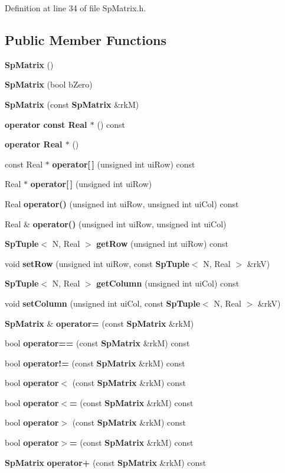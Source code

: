 Definition at line 34 of file Sp\-Matrix.h.\subsection*{Public Member Functions}
\begin{CompactItemize}
\item 
{\bf Sp\-Matrix} ()
\item 
{\bf Sp\-Matrix} (bool b\-Zero)
\item 
{\bf Sp\-Matrix} (const {\bf Sp\-Matrix} \&rk\-M)
\item 
{\bf operator const Real $\ast$} () const
\item 
{\bf operator Real $\ast$} ()
\item 
const Real $\ast$ {\bf operator[$\,$]} (unsigned int ui\-Row) const
\item 
Real $\ast$ {\bf operator[$\,$]} (unsigned int ui\-Row)
\item 
Real {\bf operator()} (unsigned int ui\-Row, unsigned int ui\-Col) const
\item 
Real \& {\bf operator()} (unsigned int ui\-Row, unsigned int ui\-Col)
\item 
{\bf Sp\-Tuple}$<$ N, Real $>$ {\bf get\-Row} (unsigned int ui\-Row) const
\item 
void {\bf set\-Row} (unsigned int ui\-Row, const {\bf Sp\-Tuple}$<$ N, Real $>$ \&rk\-V)
\item 
{\bf Sp\-Tuple}$<$ N, Real $>$ {\bf get\-Column} (unsigned int ui\-Col) const
\item 
void {\bf set\-Column} (unsigned int ui\-Col, const {\bf Sp\-Tuple}$<$ N, Real $>$ \&rk\-V)
\item 
{\bf Sp\-Matrix} \& {\bf operator=} (const {\bf Sp\-Matrix} \&rk\-M)
\item 
bool {\bf operator==} (const {\bf Sp\-Matrix} \&rk\-M) const
\item 
bool {\bf operator!=} (const {\bf Sp\-Matrix} \&rk\-M) const
\item 
bool {\bf operator$<$} (const {\bf Sp\-Matrix} \&rk\-M) const
\item 
bool {\bf operator$<$=} (const {\bf Sp\-Matrix} \&rk\-M) const
\item 
bool {\bf operator$>$} (const {\bf Sp\-Matrix} \&rk\-M) const
\item 
bool {\bf operator$>$=} (const {\bf Sp\-Matrix} \&rk\-M) const
\item 
{\bf Sp\-Matrix} {\bf operator+} (const {\bf Sp\-Matrix} \&rk\-M) const
\item 

\end{CompactItemize}
